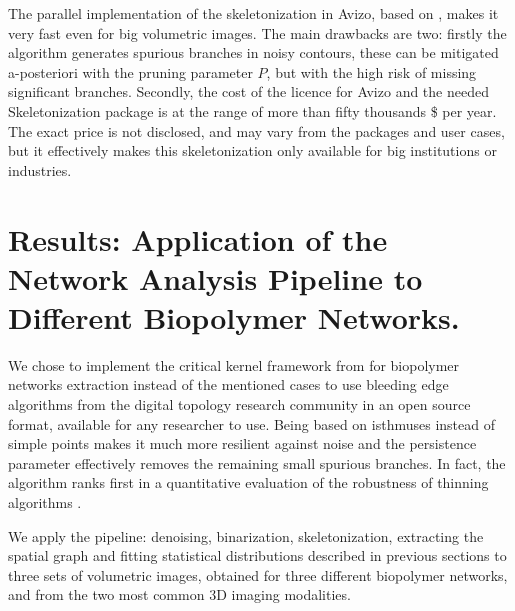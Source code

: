 
The parallel implementation of the skeletonization in Avizo, based on \cite{fouard_skeletonization_2004}, makes it very fast even for big volumetric images.
The main drawbacks are two: firstly the algorithm generates spurious branches in noisy contours,
these can be mitigated a-posteriori with the pruning parameter $P$, but with the high risk of missing significant branches.
Secondly, the cost of the licence for Avizo and the needed Skeletonization package is at the range of more than fifty thousands \$ per year. The exact price is not disclosed, and may vary from the packages and user cases, but it effectively makes this skeletonization only available for big institutions or industries.

\section{Results: Application of the Network Analysis Pipeline to Different Biopolymer Networks.}%
\label{sec:sg_results}


We chose to implement the critical kernel framework from \citep{bertrand_powerful_2014} for biopolymer networks extraction instead of the mentioned cases to use bleeding edge algorithms from the digital topology research community in an open source format, available for any researcher to use. Being based on isthmuses instead of simple points makes it much more resilient against noise and the persistence parameter effectively removes the remaining small spurious branches. In fact, the algorithm ranks first in a quantitative evaluation of the robustness of thinning algorithms \cite{bertrand_powerful_2014, couprie_3d_2015}.

We apply the pipeline: denoising, binarization, skeletonization, extracting the spatial graph and fitting statistical distributions described in previous sections to three sets of volumetric images, obtained for three different biopolymer networks, and from the two most common 3D imaging modalities.

